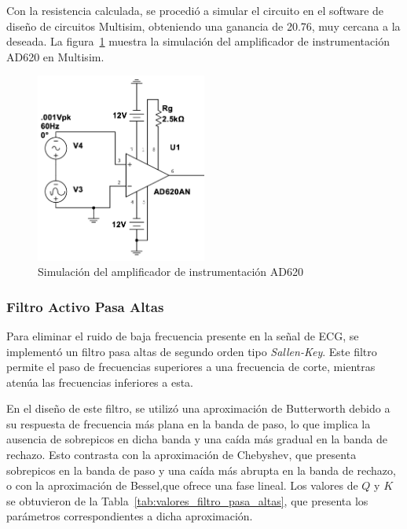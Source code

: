         Con la resistencia calculada, se procedió a simular el circuito en el software de diseño de circuitos Multisim, obteniendo una ganancia de 20.76, muy cercana a la deseada. La figura~\ref{fig:Simulacion_AD620} muestra la simulación del amplificador de instrumentación AD620 en Multisim.

        \begin{figure}[H]
            \centering
            \includegraphics[width=0.5\textwidth]{img/Desarrollo/multisim_AD620AN.png}
            \caption[Simulación del amplificador de instrumentación AD620.]{Simulación del amplificador de instrumentación AD620\footnotemark}
            \label{fig:Simulacion_AD620}
        \end{figure}

        \subsubsection{Filtro Activo Pasa Altas}
        Para eliminar el ruido de baja frecuencia presente en la señal de ECG, se implementó un filtro pasa altas de segundo orden tipo \textit{Sallen-Key}. Este filtro permite el paso de frecuencias superiores a una frecuencia de corte, mientras atenúa las frecuencias inferiores a esta.

        En el diseño de este filtro, se utilizó una aproximación de Butterworth debido a su respuesta de frecuencia más plana en la banda de paso, lo que implica la ausencia de sobrepicos en dicha banda y una caída más gradual en la banda de rechazo. Esto contrasta con la aproximación de Chebyshev, que presenta sobrepicos en la banda de paso y una caída más abrupta en la banda de rechazo, o con la aproximación de Bessel,que  ofrece una fase lineal. Los valores de $Q$ y $K$ se obtuvieron de la Tabla~\ref{tab:valores_filtro_pasa_altas}, que presenta los parámetros correspondientes a dicha aproximación.

